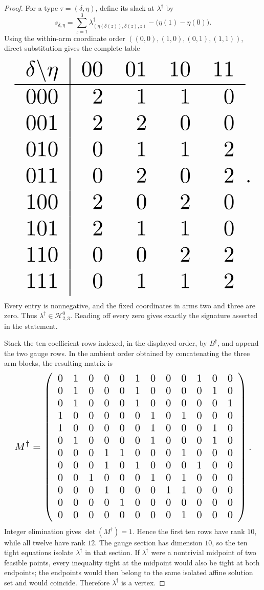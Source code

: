 \documentclass{article}
\begin{document}
\begin{proof}
For a type \(\tau=(\delta,\eta)\), define its slack at \(\lambda^\dagger\) by
\[s_{\delta,\eta}=\sum_{z=1}^{3}\lambda^\dagger_{(\eta(\delta(z)),\delta(z),z)}-\bigl(\eta(1)-\eta(0)\bigr).\]
Using the within-arm coordinate order \(((0,0),(1,0),(0,1),(1,1))\), direct substitution gives the complete table
\[
\makebox[\linewidth][c]{\resizebox{0.98\linewidth}{!}{\par\noindent \makebox[\linewidth][c]{\resizebox{0.98\linewidth}{!}{\(\displaystyle \displaystyle \begin{array}{c|rrrr}\delta\backslash\eta&00&01&10&11\\ \hline 000&2&1&1&0\\001&2&2&0&0\\010&0&1&1&2\\011&0&2&0&2\\100&2&0&2&0\\101&2&1&1&0\\110&0&0&2&2\\111&0&1&1&2\end{array}.\)}}\par\noindent}}
\]
Every entry is nonnegative, and the fixed coordinates in arms two and three are zero. Thus \(\lambda^\dagger\in\mathcal H^0_{2,3}\). Reading off every zero gives exactly the signature asserted in the statement.

Stack the ten coefficient rows indexed, in the displayed order, by \(B^\dagger\), and append the two gauge rows. In the ambient order obtained by concatenating the three arm blocks, the resulting matrix is
\[
\makebox[\linewidth][c]{\resizebox{0.98\linewidth}{!}{\par\noindent \makebox[\linewidth][c]{\resizebox{0.98\linewidth}{!}{\(\displaystyle \displaystyle M^\dagger=\left(\begin{array}{rrrrrrrrrrrr}0&1&0&0&0&1&0&0&0&1&0&0\\0&1&0&0&0&1&0&0&0&0&1&0\\0&1&0&0&0&1&0&0&0&0&0&1\\1&0&0&0&0&0&1&0&1&0&0&0\\1&0&0&0&0&0&1&0&0&0&1&0\\0&1&0&0&0&0&1&0&0&0&1&0\\0&0&0&1&1&0&0&0&1&0&0&0\\0&0&0&1&0&1&0&0&0&1&0&0\\0&0&1&0&0&0&1&0&1&0&0&0\\0&0&0&1&0&0&0&1&1&0&0&0\\0&0&0&0&1&0&0&0&0&0&0&0\\0&0&0&0&0&0&0&0&1&0&0&0\end{array}\right).\)}}\par\noindent}}
\]
Integer elimination gives \(\det(M^\dagger)=1\). Hence the first ten rows have rank \(10\), while all twelve have rank \(12\). The gauge section has dimension \(10\), so the ten tight equations isolate \(\lambda^\dagger\) in that section. If \(\lambda^\dagger\) were a nontrivial midpoint of two feasible points, every inequality tight at the midpoint would also be tight at both endpoints; the endpoints would then belong to the same isolated affine solution set and would coincide. Therefore \(\lambda^\dagger\) is a vertex.


\end{proof}
\end{document}
